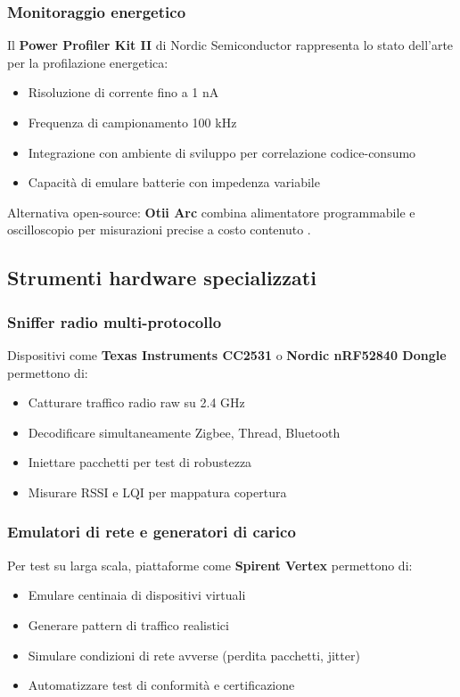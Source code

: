 \subsubsection{Monitoraggio energetico}

Il \textbf{Power Profiler Kit II} di Nordic Semiconductor rappresenta lo stato dell'arte per la profilazione energetica:
\begin{itemize}
    \item Risoluzione di corrente fino a 1 nA
    \item Frequenza di campionamento 100 kHz
    \item Integrazione con ambiente di sviluppo per correlazione codice-consumo
    \item Capacità di emulare batterie con impedenza variabile
\end{itemize}

Alternativa open-source: \textbf{Otii Arc} combina alimentatore programmabile e oscilloscopio per misurazioni precise a costo contenuto \cite{PowerProfiler}.

\subsection{Strumenti hardware specializzati}

\subsubsection{Sniffer radio multi-protocollo}

Dispositivi come \textbf{Texas Instruments CC2531} o \textbf{Nordic nRF52840 Dongle} permettono di:
\begin{itemize}
    \item Catturare traffico radio raw su 2.4 GHz
    \item Decodificare simultaneamente Zigbee, Thread, Bluetooth
    \item Iniettare pacchetti per test di robustezza
    \item Misurare RSSI e LQI per mappatura copertura
\end{itemize}

\subsubsection{Emulatori di rete e generatori di carico}

Per test su larga scala, piattaforme come \textbf{Spirent Vertex} permettono di:
\begin{itemize}
    \item Emulare centinaia di dispositivi virtuali
    \item Generare pattern di traffico realistici
    \item Simulare condizioni di rete avverse (perdita pacchetti, jitter)
    \item Automatizzare test di conformità e certificazione
\end{itemize}

